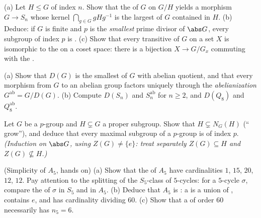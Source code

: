 \begin{exercise}[$\star\star$]\label{exo:b3:groups:8}
(a) Let $H \leq G$ of index $n$. Show that the  of $G$ on
$G/H$ yields a morphism $G \to S_n$ whose kernel $\bigcap_{g \in
G} gHg^{-1}$ is the largest  of $G$ contained in
$H$.
(b) Deduce: if $G$ is finite and $p$ is the \emph{smallest} prime
divisor of $\abs G$, every subgroup of index $p$ is .
(c) Show that every transitive  of $G$ on a set $X$ is
isomorphic to the  on a coset space: there is a bijection $X
\to G/G_x$ commuting with the .
\end{exercise}

\begin{exercise}[$\star\star$]\label{exo:b3:groups:9}
(a) Show that $D(G)$ is the smallest  of $G$ with
abelian quotient, and that every morphism from $G$ to an abelian
group factors uniquely through the \emph{abelianization}
$G^{\mathrm{ab}} = G/D(G)$.
(b) Compute $D(S_n)$ and $S_n^{\mathrm{ab}}$ for $n \geq 2$, and
$D(Q_8)$ and $Q_8^{\mathrm{ab}}$.
\end{exercise}

\begin{exercise}[$\star\star$]\label{exo:b3:groups:10}
Let $G$ be a $p$-group and $H \subsetneq G$ a proper subgroup.
Show that $H \subsetneq N_G(H)$ (`` grow''), and deduce
that every maximal subgroup of a $p$-group is  of index $p$.
\emph{(Induction on $\abs G$, using $Z(G) \neq \{e\}$: treat
separately $Z(G) \subseteq H$ and $Z(G) \not\subseteq H$.)}
\end{exercise}

\begin{exercise}[$\star\star\star$]\label{exo:b3:groups:11}
(Simplicity of $A_5$, hands on)
(a) Show that the  of $A_5$ have cardinalities
$1$, $15$, $20$, $12$, $12$. Pay attention to the splitting of the
$S_5$-class of $5$-cycles: for a $5$-cycle $\sigma$, compare the
 of $\sigma$ in $S_5$ and in $A_5$.
(b) Deduce that $A_5$ is : a  is a union of
, contains $e$, and has cardinality dividing
$60$.
(c) Show that a  of order $60$ necessarily has $n_5 =
6$.
\end{exercise}

